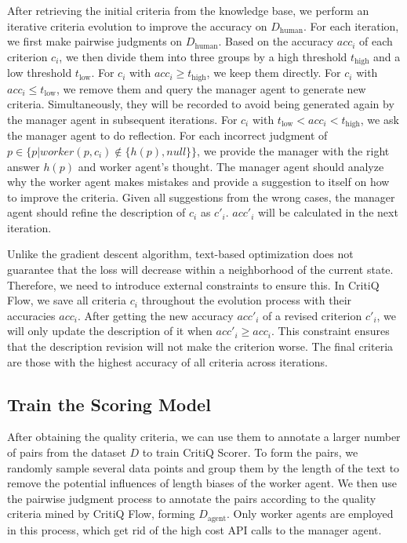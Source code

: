 After retrieving the initial criteria from the knowledge base, we perform an iterative
criteria evolution to improve the accuracy on $D_{\text{human}}$. For each
iteration, we first make pairwise judgments on $D_{\text{human}}$. Based on the
accuracy $acc_{i}$ of each criterion $c_{i}$, we then divide them into three groups
by a high threshold $t_{\text{high}}$ and a low threshold $t_{\text{low}}$. For
$c_{i}$ with $acc_{i}\geq t_{\text{high}}$, we keep them directly. For $c_{i}$
with $acc_{i}\leq t_{\text{low}}$, we remove them and query the manager agent to generate
new criteria. Simultaneously, they will be recorded to avoid
being generated again by the manager agent in subsequent iterations. For $c_{i}$
with $t_{\text{low}}< acc_{i}< t_{\text{high}}$, we ask the manager agent to do reflection.
For each incorrect judgment of
$p\in \{p|worker(p, c_{i})\notin \{h(p ), null\} \}$, we provide the manager with
the right answer $h(p)$ and worker agent's thought. The manager agent should
analyze why the worker agent makes mistakes and provide a suggestion to itself
on how to improve the criteria. Given all suggestions from the wrong cases, the
manager agent should refine the description of $c_{i}$ as $c'_{i}$. $acc'_{i}$ will
be calculated in the next iteration.

Unlike the gradient descent algorithm, text-based optimization does not
guarantee that the loss will decrease within a neighborhood of the current state.
Therefore, we need to introduce external constraints to ensure this. In CritiQ Flow,
we save all criteria $c_{i}$ throughout the evolution process with their
accuracies $acc_{i}$. After getting the new accuracy $acc'_{i}$ of a revised criterion
$c'_{i}$, we will only update the description of it when
$acc'_{i}\geq acc_{i}$. This constraint ensures that the description revision will
not make the criterion worse. The final criteria are those with the highest
accuracy of all criteria across iterations.

\subsection{Train the Scoring Model}

After obtaining the quality criteria, we can use them to annotate a larger
number of pairs from the dataset $D$ to train CritiQ Scorer. To form the pairs,
we randomly sample several data points and group them by the length of the text
to remove the potential influences of length biases of the worker
agent. We then use the pairwise judgment process to annotate the pairs according to the
quality criteria mined by CritiQ Flow, forming $D_{\text{agent}}$. Only worker agents are employed in
this process, which get rid of the high cost API calls to the manager agent.

